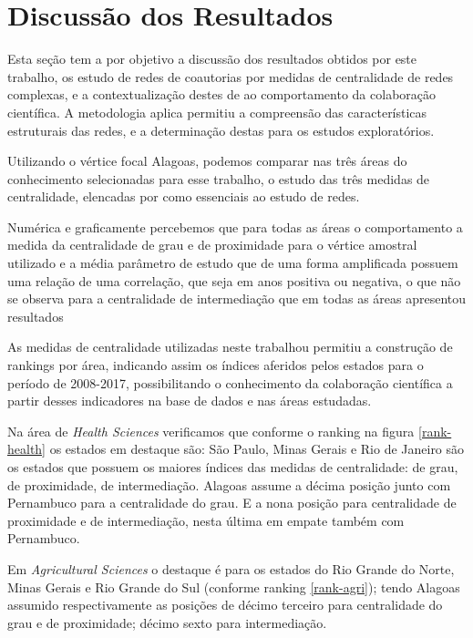 \section{\textbf{Discussão dos Resultados}}

Esta seção tem a por objetivo a discussão dos resultados obtidos por este trabalho, os estudo de redes de coautorias por medidas de centralidade de redes complexas, e a contextualização destes de ao comportamento da colaboração científica. A metodologia aplica permitiu a compreensão das características estruturais das redes, e a determinação destas para os estudos exploratórios.

Utilizando o vértice focal Alagoas, podemos comparar nas três áreas do conhecimento selecionadas para esse trabalho, o estudo das três medidas de centralidade, elencadas por \citep{freeman1991centrality} como essenciais ao estudo de redes.

Numérica e graficamente percebemos que para todas as áreas o comportamento a medida da centralidade de grau e de proximidade para o vértice amostral utilizado e a média parâmetro de estudo que de uma forma amplificada possuem uma relação de uma correlação, que seja em anos positiva ou negativa, o que não se observa para a centralidade de intermediação que em todas as áreas apresentou resultados  

As medidas de centralidade utilizadas neste trabalhou permitiu a construção de rankings por área, indicando assim os índices aferidos pelos estados para o período de 2008-2017, possibilitando o conhecimento da colaboração científica a partir desses indicadores na base de dados e nas áreas estudadas.

Na área de \textit{Health Sciences} verificamos que conforme o ranking na figura \ref{rank-health} os estados em destaque são: São Paulo, Minas Gerais e Rio de Janeiro são os estados que possuem os maiores índices das medidas de centralidade: de grau, de proximidade, de intermediação. Alagoas assume a décima posição junto com Pernambuco para a centralidade do grau. E a nona posição para centralidade de proximidade e de intermediação, nesta última em empate também com Pernambuco.

Em \textit{Agricultural Sciences} o destaque é para os estados do Rio Grande do Norte, Minas Gerais e Rio Grande do Sul (conforme ranking \ref{rank-agri}); tendo Alagoas assumido respectivamente as posições de décimo terceiro para centralidade do grau e de proximidade; décimo sexto para intermediação. 


